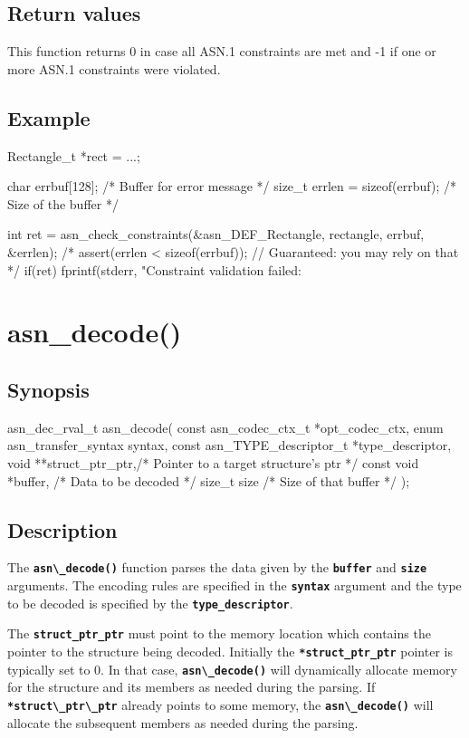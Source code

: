 \documentclass[english,oneside,12pt]{book}
\newcommand{\apisection}[2]{\clearpage\section{\label{#1}#2}}
\newcommand{\code}[1]{\texttt{\textbf{\lstinline{#1}}}}
\begin{document}
\subsection*{Return values}

This function returns 0 in case all ASN.1 constraints are met
and -1 if one or more ASN.1 constraints were violated.

\subsection*{Example}

\begin{codesample}[basicstyle=\scriptsize\listingfont]
Rectangle_t *rect = ...;

char errbuf[128];  /* Buffer for error message */
size_t errlen = sizeof(errbuf);  /* Size of the buffer */

int ret = asn_check_constraints(&asn_DEF_Rectangle, rectangle, errbuf, &errlen);
/* assert(errlen < sizeof(errbuf)); // Guaranteed: you may rely on that */
if(ret) {
    fprintf(stderr, "Constraint validation failed: %
}
\end{codesample}

\apisection{sec:asn_decode}{asn\_decode()}

\subsection*{Synopsis}
\begin{signature}
asn_dec_rval_t asn_decode(
    const asn_codec_ctx_t *opt_codec_ctx,
    enum asn_transfer_syntax syntax,
    const asn_TYPE_descriptor_t *type_descriptor,
    void **struct_ptr_ptr,/* Pointer to a target structure's ptr */
    const void *buffer,   /* Data to be decoded */
    size_t size           /* Size of that buffer */
);
\end{signature}

\subsection*{Description}

The \code{asn\_decode()} function parses the data given by the \code{buffer}
and \code{size} arguments. The encoding rules are specified in the \code{syntax}
argument and the type to be decoded is specified by the \code{type_descriptor}.

The \code{struct_ptr_ptr} must point to the memory location which contains the
pointer to the structure being decoded. Initially the \code{*struct_ptr_ptr}
pointer is typically set to 0. In that case, \code{asn\_decode()} will
dynamically allocate memory for the structure and its members as needed
during the parsing.
If \code{*struct\_ptr\_ptr} already points to some memory, the \code{asn\_decode()}
will allocate the subsequent members as needed during the parsing.
\end{document}
